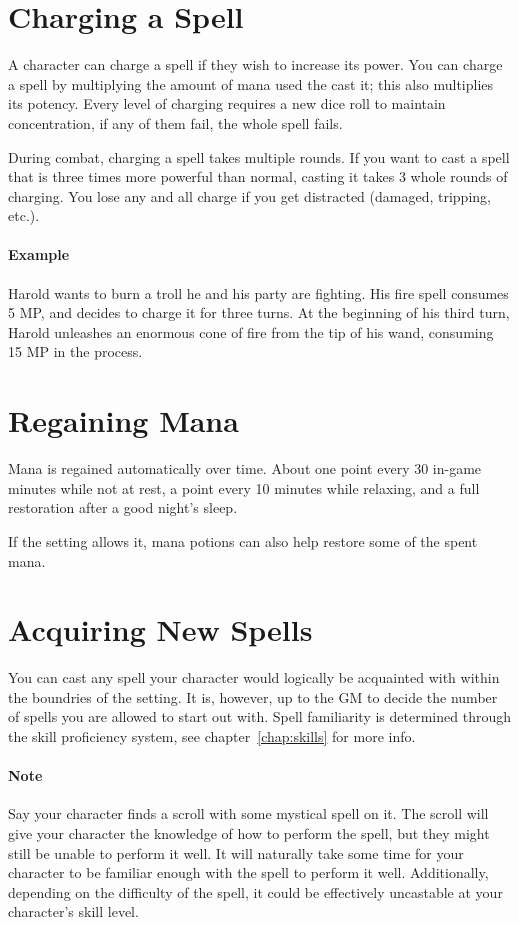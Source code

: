 \section{Charging a Spell}
A character can charge a spell if they wish to increase its power.
You can charge a spell by multiplying the amount of mana used the cast it;
this also multiplies its potency.
Every level of charging requires a new dice roll to maintain concentration, if any of them fail, the whole spell fails.

During combat, charging a spell takes multiple rounds.
If you want to cast a spell that is three times more powerful than normal, casting it takes 3 whole rounds of charging.
You lose any and all charge if you get distracted (damaged, tripping, etc.).

\paragraph{Example} Harold wants to burn a troll he and his party are fighting.
His fire spell consumes 5 MP, and decides to charge it for three turns.
At the beginning of his third turn, Harold unleashes an enormous cone of fire from the tip of his wand, consuming 15 MP in the process.

\section{Regaining Mana}
Mana is regained automatically over time.
About one point every 30 in-game minutes while not at rest,
a point every 10 minutes while relaxing,
and a full restoration after a good night's sleep.

If the setting allows it, mana potions can also help restore some of the spent mana.

\section{Acquiring New Spells}
You can cast any spell your character would logically be acquainted with within the boundries of the setting.
It is, however, up to the GM to decide the number of spells you are allowed to start out with.
Spell familiarity is determined through the skill proficiency system, see chapter~\ref{chap:skills} for more info.

\paragraph{Note} Say your character finds a scroll with some mystical spell on it.
The scroll will give your character the knowledge of how to perform the spell, but they might still be unable to perform it well.
It will naturally take some time for your character to be familiar enough with the spell to perform it well.
Additionally, depending on the difficulty of the spell, it could be effectively uncastable at your character's skill level.
